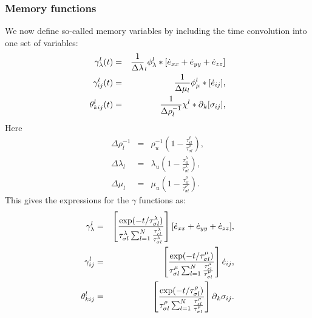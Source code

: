 \documentclass[11pt]{article}
\begin{document}
\subsubsection{Memory functions} 
We now define so-called memory variables by including the time 
convolution into one set of variables:
\begin{eqnarray}
 \gamma^l_{\lambda}(t) 
  & =& \frac{1}{\Delta\lambda}_l \phi^l_{\lambda}
       *[\dot{e}_{xx}+\dot{e}_{yy}+\dot{e}_{zz}]                  \nonumber \\ 
 \gamma^l_{ij}(t) 
  & =& \frac{1}{\Delta\mu_l}\phi^l_{\mu}
       *[\dot{e}_{ij}],                                           \nonumber \\
 \theta^l_{kij}(t) 
  & =& \frac{1}{\Delta\rho^{-1}_l}\chi^l*\mbox{$\partial$}_k[\sigma_{ij}],  
                                                \label{eq:gamma-l}
\end{eqnarray}
Here 
\begin{eqnarray}
  \Delta\rho^{-1}_l 
     & = & \rho^{-1}_u\left(1-\frac{\tau^{\rho}_{\epsilon l}}
                                   {\tau^{\rho}_{\sigma l}}\right),\nonumber \\
 \Delta\lambda_l                              
     & = & \lambda_u\left(1-\frac{\tau^{\lambda}_{\epsilon l}}
                              {\tau^{\lambda}_{\sigma l}}\right),  \nonumber \\
 \Delta\mu_l                              
     & = & \mu_u\left(1-\frac{\tau^{\mu}_{\epsilon l}}
                              {\tau^{\rho}_{\sigma l}}\right).    
\end{eqnarray}
This gives the expressions for the $\gamma$ functions as:
\begin{eqnarray}
 \gamma^l_{\lambda}    
    & = & \left[\frac{\exp(-t/\tau^{\lambda}_{\sigma l})}
                     {\tau^{\lambda}_{\sigma l}
                     \sum_{l=1}^N \frac{\tau^{\lambda}_{\epsilon l}}
                     {\tau^{\lambda}_{\sigma l}}}\right] 
                     [\dot{e}_{xx}+\dot{e}_{yy}+\dot{e}_{zz}],   \nonumber  \\
 \gamma^l_{ij}    
   & = & \left[\frac{\exp(-t/\tau^{\mu}_{\sigma l})}
                     {\tau^{\mu}_{\sigma l}
                     \sum_{l=1}^N \frac{\tau^{\mu}_{\epsilon l}}
                     {\tau^{\mu}_{\sigma l}}}\right] 
                     \dot{e}_{ij},                                \nonumber \\
 \theta^l_{kij}    
   & = & \left[\frac{\exp(-t/\tau^{\rho}_{\sigma l})}
                    {\tau^{\rho}_{\sigma l}
                    \sum_{l=1}^N \frac{\tau^{\rho}_{\epsilon l}}
                    {\tau^{\rho}_{\sigma l}}}\right] 
                    \mbox{$\partial$}_k \sigma_{ij}.
\end{eqnarray}
\end{document}

